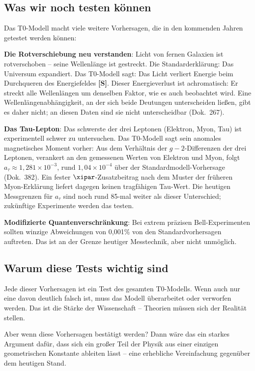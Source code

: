 	
	\subsection{Was wir noch testen können}
	
	Das T0-Modell macht viele weitere Vorhersagen, die in den kommenden Jahren getestet werden können:
	
		\textbf{Die Rotverschiebung neu verstanden}: Licht von fernen Galaxien ist rotverschoben -- seine Wellenlänge ist gestreckt. Die Standarderklärung: Das Universum expandiert. Das T0-Modell sagt: Das Licht verliert Energie beim Durchqueren des Energiefeldes \textbf{[S]}. Dieser Energieverlust ist achromatisch: Er streckt alle Wellenlängen um denselben Faktor, wie es auch beobachtet wird. Eine Wellenlängenabhängigkeit, an der sich beide Deutungen unterscheiden ließen, gibt es daher nicht; an diesen Daten sind sie nicht unterscheidbar (Dok.~267).
	
	\textbf{Das Tau-Lepton}: Das schwerste der drei Leptonen (Elektron, Myon, Tau) ist experimentell schwer zu untersuchen. Das T0-Modell sagt sein anomales magnetisches Moment vorher: Aus dem Verhältnis der $g-2$-Differenzen der drei Leptonen, verankert an den gemessenen Werten von Elektron und Myon, folgt $a_\tau \approx 1{,}281 \times 10^{-3}$, rund $1{,}04\times10^{-4}$ über der Standardmodell-Vorhersage (Dok.~382). Ein fester $\xipar$-Zusatzbeitrag nach dem Muster der früheren Myon-Erklärung liefert dagegen keinen tragfähigen Tau-Wert. Die heutigen Messgrenzen für $a_\tau$ sind noch rund 85-mal weiter als dieser Unterschied; zukünftige Experimente werden das testen.
	
	\textbf{Modifizierte Quantenverschränkung}: Bei extrem präzisen Bell-Experimenten sollten winzige Abweichungen von 0,001\% von den Standardvorhersagen auftreten. Das ist an der Grenze heutiger Messtechnik, aber nicht unmöglich.
	
	\subsection{Warum diese Tests wichtig sind}
	
	Jede dieser Vorhersagen ist ein Test des gesamten T0-Modells. Wenn auch nur eine davon deutlich falsch ist, muss das Modell überarbeitet oder verworfen werden. Das ist die Stärke der Wissenschaft -- Theorien müssen sich der Realität stellen.
	
	Aber wenn diese Vorhersagen bestätigt werden? Dann wäre das ein starkes Argument dafür, dass sich ein großer Teil der Physik aus einer einzigen geometrischen Konstante ableiten lässt -- eine erhebliche Vereinfachung gegenüber dem heutigen Stand.
	
